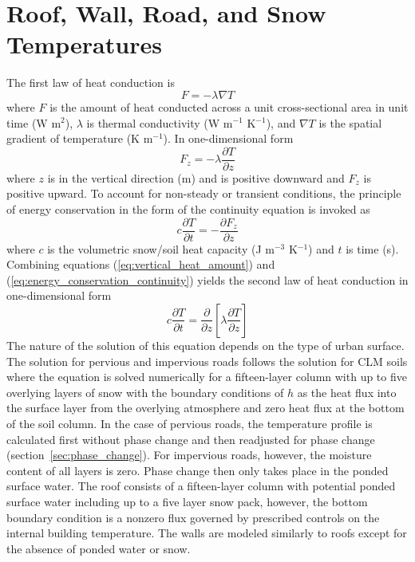 \documentclass[12pt,authoryear]{elsarticle}
\numberwithin{equation}{section} %
\begin{document}
\section{Roof, Wall, Road, and Snow Temperatures}
\label{sec:temperature}
%
The first law of heat conduction is
\begin{equation}
F=-\lambda \nabla T
\end{equation}
where $F$ is the amount of heat conducted across a unit cross-sectional area in unit time (W m$^2$), $\lambda$ is thermal conductivity (W m$^{-1}$ K$^{-1}$), and $\nabla T$ is the spatial gradient of temperature (K m$^{-1}$). In one-dimensional form
\begin{equation}
\label{eq:vertical_heat_amount}
F_{z} = -\lambda\frac{\partial T}{\partial z}
\end{equation}
where $z$ is in the vertical direction (m) and is positive downward and $F_{z}$ is positive upward. To account for non-steady or transient conditions, the principle of energy conservation in the form of the continuity equation is invoked as
\begin{equation}
\label{eq:energy_conservation_continuity}
c\frac{\partial T}{\partial t} = -\frac{\partial F_{z}}{\partial z}
\end{equation}
where $c$ is the volumetric snow/soil heat capacity (J m$^{-3}$ K$^{-1}$) and $t$ is time (s). Combining equations (\ref{eq:vertical_heat_amount}) and (\ref{eq:energy_conservation_continuity}) yields the second law of heat conduction in one-dimensional form
\begin{equation}
c\frac{\partial T}{\partial t} = \frac{\partial}{\partial z}\left[\lambda \frac{\partial T}{\partial z}\right]
\end{equation}
The nature of the solution of this equation depends on the type of urban surface. The solution for pervious and impervious roads follows the solution for CLM soils where the equation is solved numerically for a fifteen-layer column with up to five overlying layers of snow with the boundary conditions of $h$ as the heat flux into the surface layer from the overlying atmosphere and zero heat flux at the bottom of the soil column. In the case of pervious roads, the temperature profile is calculated first without phase change and then readjusted for phase change (section~\ref{sec:phase_change}). For impervious roads, however, the moisture content of all layers is zero. Phase change then only takes place in the ponded surface water. The roof consists of a fifteen-layer column with potential ponded surface water including up to a five layer snow pack, however, the bottom boundary condition is a nonzero flux governed by prescribed controls on the internal building temperature. The walls are modeled similarly to roofs except for the absence of ponded water or snow.
\end{document}
